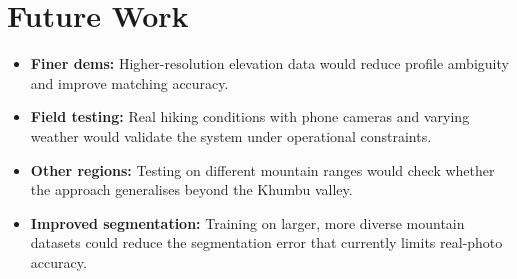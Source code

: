 \section{Future Work}

\begin{itemize}
    \item \textbf{Finer \Gls{dem}s:} Higher-resolution elevation data would reduce profile ambiguity and improve matching accuracy.
    \item \textbf{Field testing:} Real hiking conditions with phone cameras and varying weather would validate the system under operational constraints.
    \item \textbf{Other regions:} Testing on different mountain ranges would check whether the approach generalises beyond the Khumbu valley.
    \item \textbf{Improved segmentation:} Training on larger, more diverse mountain datasets could reduce the segmentation error that currently limits real-photo accuracy.
\end{itemize}

